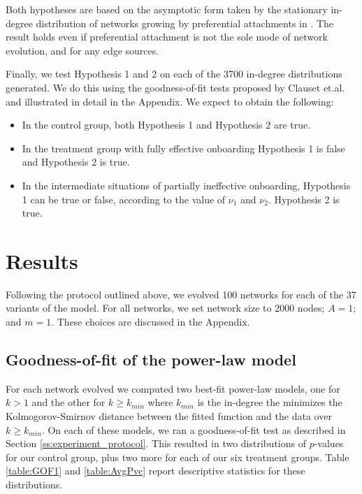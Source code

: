 \documentclass{bmcart}
\begin{document}
Both hypotheses are based on the asymptotic form taken by the stationary in-degree distribution of networks growing by preferential attachments in \cite{dorogovtsev2002evolution}. The result holds even if preferential attachment is not the sole mode of network evolution, and for any edge sources.

Finally, we test Hypothesis 1 and 2 on each of the 3700 in-degree distributions generated. We do this using the goodness-of-fit tests proposed by Clauset et.al. \cite{clauset2009power} and illustrated in detail in the Appendix. We expect to obtain the following:

\begin{itemize}
\item In the control group, both Hypothesis 1 and Hypothesis 2 are true. 
\item In the treatment group with fully effective onboarding Hypothesis 1 is false and Hypothesis 2 is true. 
\item In the intermediate situations of partially ineffective onboarding, Hypothesis 1 can be true or false, according to the value of $\nu_1$ and $\nu_2$. Hypothesis 2 is true.
\end{itemize}


\section*{Results}\label{sec:results}
Following the protocol outlined above, we evolved 100 networks for each of the 37 variants of the model. For all networks, we set network size to 2000 nodes; $A = 1$; and $m = 1$. These choices are discussed in the Appendix.

\subsection*{Goodness-of-fit of the power-law model} \label{ssec:GOF of power law}

For each network evolved we computed two best-fit power-law models, one for $k > 1$ and the other for $k\geq k_{min}$ where $k_{min}$ is the in-degree the minimizes the Kolmogorov-Smirnov distance between the fitted function and the data over $k \geq k_{min}$. On each of these models, we ran a goodness-of-fit test as described in Section \ref{ss:experiment_protocol}. This resulted in two distributions of $p$-values for our control group, plus two more for each of our six treatment groups. Table \ref{table:GOF1}
 and \ref{table:AvgPvc} report descriptive statistics for these distributions.
\end{document}

